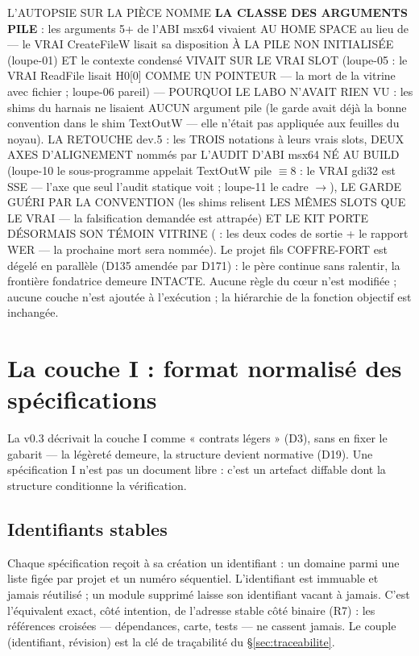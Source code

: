 L'AUTOPSIE SUR LA PIÈCE NOMME \textbf{LA CLASSE DES ARGUMENTS PILE} : les
arguments 5+ de l'ABI msx64 vivaient AU HOME SPACE \code{[rsp..0x18]} au lieu
de \code{[rsp+0x20]+} — le VRAI CreateFileW lisait sa disposition À LA PILE NON
INITIALISÉE (loupe-01) ET le contexte condensé VIVAIT SUR LE VRAI SLOT (loupe-05 :
le VRAI ReadFile lisait H0[0]  COMME UN POINTEUR — la mort de
la vitrine avec fichier ; loupe-06 pareil) — POURQUOI LE LABO N'AVAIT RIEN VU :
les shims du harnais ne lisaient AUCUN argument pile (le garde avait déjà la
bonne convention dans le shim TextOutW — elle n'était pas appliquée aux feuilles
du noyau). LA RETOUCHE dev.5 : les TROIS notations à leurs vrais slots, DEUX AXES
D'ALIGNEMENT nommés par L'AUDIT D'ABI msx64 NÉ AU BUILD (loupe-10 le
sous-programme  appelait TextOutW pile $\equiv 8$ : le VRAI
gdi32 est SSE — l'axe que seul l'audit statique voit ; loupe-11 le cadre
$\to$), LE GARDE GUÉRI PAR LA CONVENTION (les shims
relisent LES MÊMES SLOTS QUE LE VRAI — la falsification demandée est attrapée)
ET LE KIT PORTE DÉSORMAIS SON TÉMOIN VITRINE ( : les
deux codes de sortie + le rapport WER — la prochaine mort sera nommée). Le projet
fils COFFRE-FORT est dégelé en parallèle
(D135 amendée par D171) : le père continue sans ralentir, la frontière fondatrice
demeure INTACTE. Aucune règle du cœur n'est modifiée ; aucune couche n'est ajoutée
à l'exécution ; la hiérarchie de la fonction objectif est inchangée.

\section{La couche I : format normalisé des spécifications}\label{sec:coucheI}

La v0.3 décrivait la couche I comme « contrats légers » (D3), sans en fixer le gabarit —
la légèreté demeure, la structure devient normative (D19). Une spécification I n’est pas un
document libre : c’est un artefact diffable dont la structure conditionne la vérification.

\subsection{Identifiants stables}

Chaque spécification reçoit à sa création un identifiant  : un domaine
parmi une liste figée par projet et un numéro séquentiel. L’identifiant est immuable et
jamais réutilisé ; un module supprimé laisse son identifiant vacant à jamais. C’est
l’équivalent exact, côté intention, de l’adresse stable côté binaire (R7) : les références
croisées — dépendances, carte, tests — ne cassent jamais. Le couple (identifiant,
révision) est la clé de traçabilité du §\ref{sec:traceabilite}.

